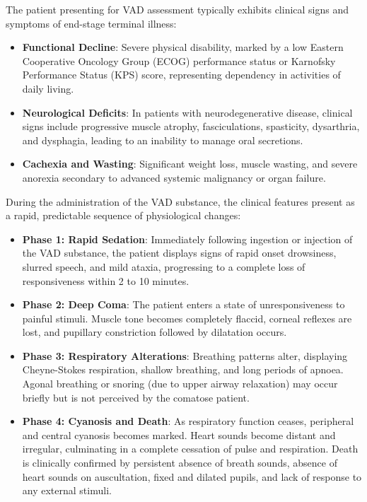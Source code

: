The patient presenting for VAD assessment typically exhibits clinical signs and symptoms of end-stage terminal illness:
\begin{itemize}
    \item \textbf{Functional Decline}: Severe physical disability, marked by a low Eastern Cooperative Oncology Group (ECOG) performance status or Karnofsky Performance Status (KPS) score, representing dependency in activities of daily living.
    \item \textbf{Neurological Deficits}: In patients with neurodegenerative disease, clinical signs include progressive muscle atrophy, fasciculations, spasticity, dysarthria, and dysphagia, leading to an inability to manage oral secretions.
    \item \textbf{Cachexia and Wasting}: Significant weight loss, muscle wasting, and severe anorexia secondary to advanced systemic malignancy or organ failure.
\end{itemize}

During the administration of the VAD substance, the clinical features present as a rapid, predictable sequence of physiological changes:
\begin{itemize}
    \item \textbf{Phase 1: Rapid Sedation}: Immediately following ingestion or injection of the VAD substance, the patient displays signs of rapid onset drowsiness, slurred speech, and mild ataxia, progressing to a complete loss of responsiveness within 2 to 10 minutes.
    \item \textbf{Phase 2: Deep Coma}: The patient enters a state of unresponsiveness to painful stimuli. Muscle tone becomes completely flaccid, corneal reflexes are lost, and pupillary constriction followed by dilatation occurs.
    \item \textbf{Phase 3: Respiratory Alterations}: Breathing patterns alter, displaying Cheyne-Stokes respiration, shallow breathing, and long periods of apnoea. Agonal breathing or snoring (due to upper airway relaxation) may occur briefly but is not perceived by the comatose patient.
    \item \textbf{Phase 4: Cyanosis and Death}: As respiratory function ceases, peripheral and central cyanosis becomes marked. Heart sounds become distant and irregular, culminating in a complete cessation of pulse and respiration. Death is clinically confirmed by persistent absence of breath sounds, absence of heart sounds on auscultation, fixed and dilated pupils, and lack of response to any external stimuli.
\end{itemize}

